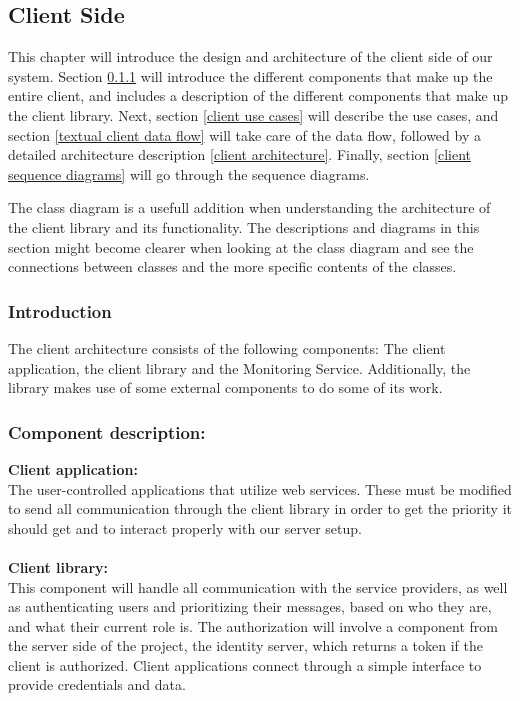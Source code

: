 \subsection{Client Side}\label{client side}

This chapter will introduce the design and architecture of the client side of our system. Section \ref{client introduction} will introduce the different components that make up the entire client, and includes a description of the different components that make up the client library. Next, section \ref{client use cases} will describe the use cases, and section \ref{textual client data flow} will take care of the data flow, followed by a detailed architecture description \ref{client architecture}. Finally, section \ref{client sequence diagrams} will go through the sequence diagrams.
    
    The class diagram is a usefull addition when understanding the architecture of the client library and its functionality. The descriptions and diagrams in this section might become clearer when looking at the class diagram and see the connections between classes and the more specific contents of the classes. 
		
    \subsubsection{Introduction}\label{client introduction}
The client architecture consists of the following components: The client application, the client library and the Monitoring Service. Additionally, the library makes use of some external components to do some of its work.

    \subsubsection{Component description:}\label{Component description}

\indent \indent \textbf{Client application:}\\
	The user-controlled applications that utilize web services. These must be modified to send all communication through the client library in order to get the priority it should get and to interact properly with our server setup.
\\\\

\indent \textbf{Client library:}\\
This component will handle all communication with the service providers, as well as authenticating users and prioritizing their messages, based on who they are, and what their current role is. The authorization will involve a component from the server side of the project, the identity server, which returns a token if the client is authorized. Client applications connect through a simple interface to provide credentials and data.
\\\\ 

